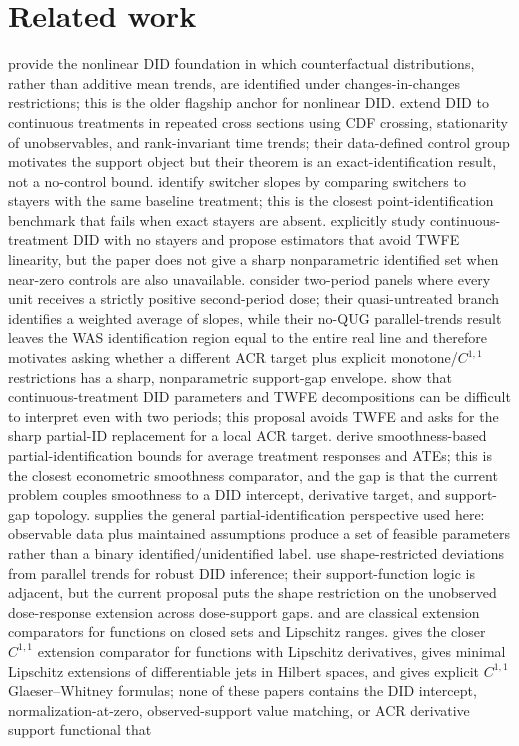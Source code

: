 \documentclass[11pt]{article}
\theoremstyle{definition}
\theoremstyle{plain}
\theoremstyle{remark}
\begin{document}
\section{Related work}
\citet{AtheyImbens2006} provide the nonlinear DID foundation in which counterfactual distributions, rather than additive mean trends, are identified under changes-in-changes restrictions; this is the older flagship anchor for nonlinear DID.  \citet{DHaultfoeuilleHoderleinSasaki2023} extend DID to continuous treatments in repeated cross sections using CDF crossing, stationarity of unobservables, and rank-invariant time trends; their data-defined control group motivates the support object but their theorem is an exact-identification result, not a no-control bound.  \citet{DCDHPSVB2025ContinuousEveryPeriod} identify switcher slopes by comparing switchers to stayers with the same baseline treatment; this is the closest point-identification benchmark that fails when exact stayers are absent.  \citet{DCDHVB2024NoStayers} explicitly study continuous-treatment DID with no stayers and propose estimators that avoid TWFE linearity, but the paper does not give a sharp nonparametric identified set when near-zero controls are also unavailable.  \citet{DCDHK2026NoUntreated} consider two-period panels where every unit receives a strictly positive second-period dose; their quasi-untreated branch identifies a weighted average of slopes, while their no-QUG parallel-trends result leaves the WAS identification region equal to the entire real line and therefore motivates asking whether a different ACR target plus explicit monotone/\(C^{1,1}\) restrictions has a sharp, nonparametric support-gap envelope.  \citet{CallawayGoodmanBaconSantAnna2024} show that continuous-treatment DID parameters and TWFE decompositions can be difficult to interpret even with two periods; this proposal avoids TWFE and asks for the sharp partial-ID replacement for a local ACR target.  \citet{KimKwonKwonLee2018} derive smoothness-based partial-identification bounds for average treatment responses and ATEs; this is the closest econometric smoothness comparator, and the gap is that the current problem couples smoothness to a DID intercept, derivative target, and support-gap topology.  \citet{Manski2003} supplies the general partial-identification perspective used here: observable data plus maintained assumptions produce a set of feasible parameters rather than a binary identified/unidentified label.  \citet{RambachanRoth2023} use shape-restricted deviations from parallel trends for robust DID inference; their support-function logic is adjacent, but the current proposal puts the shape restriction on the unobserved dose-response extension across dose-support gaps.  \citet{Whitney1934} and \citet{McShane1934} are classical extension comparators for functions on closed sets and Lipschitz ranges.  \citet{Wells1973} gives the closer \(C^{1,1}\) extension comparator for functions with Lipschitz derivatives, \citet{LeGruyer2009} gives minimal Lipschitz extensions of differentiable jets in Hilbert spaces, and \citet{DaniilidisHaddouLeGruyerLey2018} gives explicit \(C^{1,1}\) Glaeser--Whitney formulas; none of these papers contains the DID intercept, normalization-at-zero, observed-support value matching, or ACR derivative support functional that 
\end{document}
